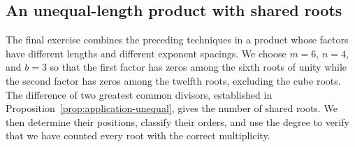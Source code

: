 \documentclass[11pt,a4paper]{article}
\numberwithin{equation}{section}
\theoremstyle{uprightpaper}
\begin{document}
\subsection{An unequal-length product with shared roots}\label{subsec:exercise-four}

The final exercise combines the preceding techniques in a product whose factors have different lengths and different exponent spacings. We choose $m=6$, $n=4$, and $b=3$ so that the first factor has zeros among the sixth roots of unity while the second factor has zeros among the twelfth roots, excluding the cube roots. The difference of two greatest common divisors, established in Proposition~\ref{prop:application-unequal}, gives the number of shared roots. We then determine their positions, classify their orders, and use the degree to verify that we have counted every root with the correct multiplicity.
\end{document}
